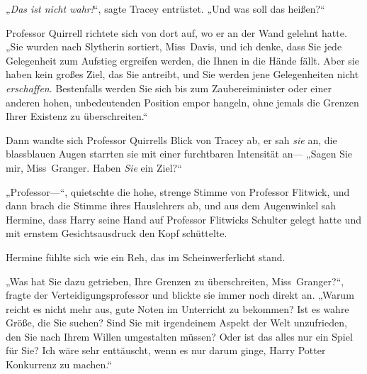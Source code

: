 „\emph{Das ist nicht wahr!}“, sagte Tracey entrüstet. „Und was soll das heißen?“

Professor Quirrell richtete sich von dort auf, wo er an der Wand gelehnt hatte. „Sie wurden nach Slytherin sortiert, Miss~Davis, und ich denke, dass Sie jede Gelegenheit zum Aufstieg ergreifen werden, die Ihnen in die Hände fällt. Aber sie haben kein großes Ziel, das Sie antreibt, und Sie werden jene Gelegenheiten nicht \emph{erschaffen}. Bestenfalls werden Sie sich bis zum Zaubereiminister oder einer anderen hohen, unbedeutenden Position empor hangeln, ohne jemals die Grenzen Ihrer Existenz zu überschreiten.“

Dann wandte sich Professor Quirrells Blick von Tracey ab, er sah \emph{sie} an, die blassblauen Augen starrten sie mit einer furchtbaren Intensität an— „Sagen Sie mir, Miss~Granger. Haben \emph{Sie} ein Ziel?“

„Professor—“, quietschte die hohe, strenge Stimme von Professor Flitwick, und dann brach die Stimme ihres Hauslehrers ab, und aus dem Augenwinkel sah Hermine, dass Harry seine Hand auf Professor Flitwicks Schulter gelegt hatte und mit ernstem Gesichtsausdruck den Kopf schüttelte.

Hermine fühlte sich wie ein Reh, das im Scheinwerferlicht stand.

„Was hat Sie dazu getrieben, Ihre Grenzen zu überschreiten, Miss~Granger?“, fragte der Verteidigungsprofessor und blickte sie immer noch direkt an. „Warum reicht es nicht mehr aus, gute Noten im Unterricht zu bekommen? Ist es wahre Größe, die Sie suchen? Sind Sie mit irgendeinem Aspekt der Welt unzufrieden, den Sie nach Ihrem Willen umgestalten müssen? Oder ist das alles nur ein Spiel für Sie? Ich wäre sehr enttäuscht, wenn es nur darum ginge, Harry Potter Konkurrenz zu machen.“

